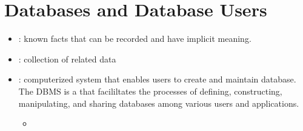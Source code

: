 \chapter{Databases and Database Users}

  \begin{itemize}
    \item {}: known facts that can be recorded and have implicit
      meaning.
    \item {}: collection of related data 
    \item {}: computerized system that
      enables users to create and maintain database. The DBMS is a
       that facililtates the processes of
      defining, constructing, manipulating, and sharing databases among various
      users and applications.
      \begin{itemize}
        \item 
      \end{itemize}
  \end{itemize}

